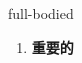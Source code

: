 
\begin{frame}
{\huge full-bodied}
\begin{center}
\begin{enumerate}\Large
  \item \textbf{重要的}
\end{enumerate}
\end{center}
\end{frame}

